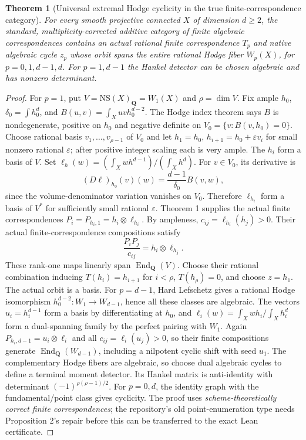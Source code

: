 \documentclass[11pt]{article}
\newtheorem{theorem}{Theorem}
\newcommand{\Q}{\mathbf Q}
\newcommand{\End}{\operatorname{End}}
\begin{document}
\begin{theorem}[Universal extremal Hodge cyclicity in the true finite-correspondence category]
For every smooth projective connected \(X\) of dimension \(d\ge2\), the standard, multiplicity-corrected additive category of finite algebraic correspondences contains an actual rational finite correspondence \(T_p\) and native algebraic cycle \(z_p\) whose orbit spans the entire rational Hodge fiber \(W_p(X)\), for \(p=0,1,d-1,d\). For \(p=1,d-1\) the Hankel detector can be chosen algebraic and has nonzero determinant.
\end{theorem}
\begin{proof}
For \(p=1\), put \(V=\mathrm{NS}(X)_\Q=W_1(X)\) and \(\rho=\dim V\). Fix ample \(h_0\), \(\delta_0=\int h_0^d\), and \(B(u,v)=\int_Xuv h_0^{d-2}\). The Hodge index theorem says \(B\) is nondegenerate, positive on \(h_0\) and negative definite on \(V_0=\{v:B(v,h_0)=0\}\). Choose rational basis \(v_1,\ldots,v_{\rho-1}\) of \(V_0\) and let \(h_1=h_0\), \(h_{i+1}=h_0+\varepsilon v_i\) for small nonzero rational \(\varepsilon\); after positive integer scaling each is very ample. The \(h_i\) form a basis of \(V\). Set \(\ell_h(w)=(\int_Xwh^{d-1})/(\int_Xh^d)\). For \(v\in V_0\), its derivative is
\[
 (D\ell)_{h_0}(v)(w)=\frac{d-1}{\delta_0}B(v,w),
\]
since the volume-denominator variation vanishes on \(V_0\). Therefore \(\ell_{h_i}\) form a basis of \(V^*\) for sufficiently small rational \(\varepsilon\). Theorem 1 supplies the actual finite correspondences \(P_i=P_{h_i,1}=h_i\otimes\ell_{h_i}\). By ampleness,
\(c_{ij}=\ell_{h_i}(h_j)>0\). Their actual finite-correspondence compositions satisfy
\[
 \frac{P_iP_j}{c_{ij}}=h_i\otimes\ell_{h_j}.
\]
These rank-one maps linearly span \(\End_\Q(V)\). Choose their rational combination inducing \(T(h_i)=h_{i+1}\) for \(i<\rho\), \(T(h_\rho)=0\), and choose \(z=h_1\). The actual orbit is a basis.
For \(p=d-1\), Hard Lefschetz gives a rational Hodge isomorphism \(h_0^{d-2}:W_1\to W_{d-1}\), hence all these classes are algebraic. The vectors \(u_i=h_i^{d-1}\) form a basis by differentiating at \(h_0\), and \(\ell_i(w)=\int_Xwh_i/\int_Xh_i^d\) form a dual-spanning family by the perfect pairing with \(W_1\). Again \(P_{h_i,d-1}=u_i\otimes\ell_i\) and all \(c_{ij}=\ell_i(u_j)>0\), so their finite compositions generate \(\End_\Q(W_{d-1})\), including a nilpotent cyclic shift with seed \(u_1\). The complementary Hodge fibers are algebraic, so choose dual algebraic cycles to define a terminal moment detector. Its Hankel matrix is anti-identity with determinant \((-1)^{\rho(\rho-1)/2}\). For \(p=0,d\), the identity graph with the fundamental/point class gives cyclicity. The proof uses \emph{scheme-theoretically correct finite correspondences}; the repository's old point-enumeration type needs Proposition 2's repair before this can be transferred to the exact Lean certificate.
\end{proof}
\end{document}
